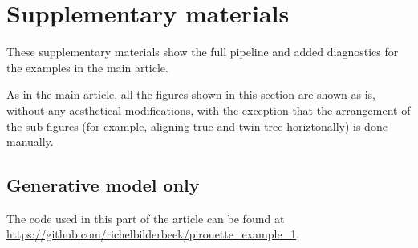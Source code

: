 \section{Supplementary materials}

These supplementary materials show the full pipeline and
added diagnostics for the examples in the main article.

As in the main article, all the figures shown in this section are shown as-is, 
without any aesthetical modifications, with the exception that the arrangement
of the sub-figures (for example, aligning true and twin tree
horiztonally) is done manually.

\subsection{Generative model only}

The code used in this part of the article can be found at 
\url{https://github.com/richelbilderbeek/pirouette_example_1}. 

